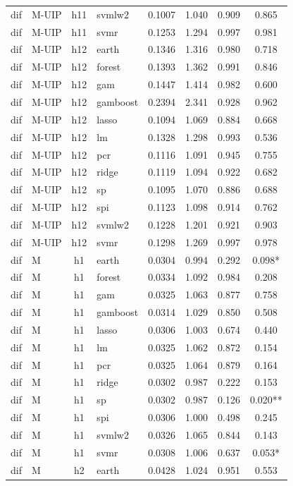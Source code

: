 \begin{ThreePartTable}
\begin{longtable}[t]{llclcccc}
dif & M-UIP & h11 & svmlw2 & 0.1007 & 1.040 & 0.909 & 0.865\\
dif & M-UIP & h11 & svmr & 0.1253 & 1.294 & 0.997 & 0.981\\
\addlinespace
dif & M-UIP & h12 & earth & 0.1346 & 1.316 & 0.980 & 0.718\\
dif & M-UIP & h12 & forest & 0.1393 & 1.362 & 0.991 & 0.846\\
dif & M-UIP & h12 & gam & 0.1447 & 1.414 & 0.982 & 0.600\\
dif & M-UIP & h12 & gamboost & 0.2394 & 2.341 & 0.928 & 0.962\\
dif & M-UIP & h12 & lasso & 0.1094 & 1.069 & 0.884 & 0.668\\
dif & M-UIP & h12 & lm & 0.1328 & 1.298 & 0.993 & 0.536\\
dif & M-UIP & h12 & pcr & 0.1116 & 1.091 & 0.945 & 0.755\\
dif & M-UIP & h12 & ridge & 0.1119 & 1.094 & 0.922 & 0.682\\
dif & M-UIP & h12 & sp & 0.1095 & 1.070 & 0.886 & 0.688\\
dif & M-UIP & h12 & spi & 0.1123 & 1.098 & 0.914 & 0.762\\
dif & M-UIP & h12 & svmlw2 & 0.1228 & 1.201 & 0.921 & 0.903\\
dif & M-UIP & h12 & svmr & 0.1298 & 1.269 & 0.997 & 0.978\\
\addlinespace
dif & M & h1 & earth & 0.0304 & 0.994 & 0.292 & 0.098*\\
dif & M & h1 & forest & 0.0334 & 1.092 & 0.984 & 0.208\\
dif & M & h1 & gam & 0.0325 & 1.063 & 0.877 & 0.758\\
dif & M & h1 & gamboost & 0.0314 & 1.029 & 0.850 & 0.508\\
dif & M & h1 & lasso & 0.0306 & 1.003 & 0.674 & 0.440\\
dif & M & h1 & lm & 0.0325 & 1.062 & 0.872 & 0.154\\
dif & M & h1 & pcr & 0.0325 & 1.064 & 0.879 & 0.164\\
dif & M & h1 & ridge & 0.0302 & 0.987 & 0.222 & 0.153\\
dif & M & h1 & sp & 0.0302 & 0.987 & 0.126 & 0.020**\\
dif & M & h1 & spi & 0.0306 & 1.000 & 0.498 & 0.245\\
dif & M & h1 & svmlw2 & 0.0326 & 1.065 & 0.844 & 0.143\\
dif & M & h1 & svmr & 0.0308 & 1.006 & 0.637 & 0.053*\\
\addlinespace
dif & M & h2 & earth & 0.0428 & 1.024 & 0.951 & 0.553\\

\end{longtable}
\end{ThreePartTable}
